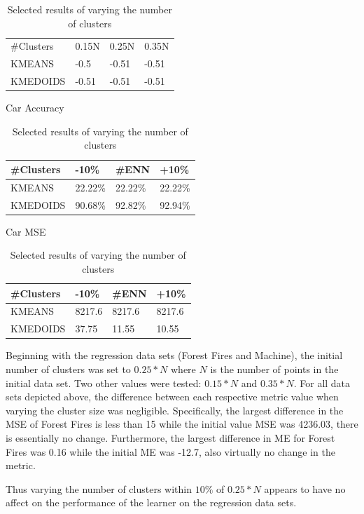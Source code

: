 \documentclass[twoside,11pt]{article}
\begin{document}
\begin{table}[h]
\begin{minipage}[b]{0.45\linewidth}
		\begin{tabular}{llll}
			\cline{1-4}
			\#Clusters & 0.15N & 0.25N & 0.35N \\  \cline{1-4}
			KMEANS     & -0.5  & -0.51 & -0.51 \\
			KMEDOIDS   & -0.51 & -0.51 & -0.51
		\end{tabular}
	\end{minipage}
	\begin{minipage}[b]{0.45\linewidth}\centering
		Car Accuracy
		\begin{tabular}{llll}
			\hline
			\#Clusters & -10\% & \#ENN   & +10\% \\ \hline
			KMEANS     & 22.22\%      & 22.22\% & 22.22\%      \\
			KMEDOIDS   & 90.68\%      & 92.82\% & 92.94\%
		\end{tabular}
	\end{minipage}
	\hspace{0.5cm}
	\begin{minipage}[b]{0.45\linewidth}
		Car MSE
		\centering
		\begin{tabular}{llll}
			\hline
			\#Clusters & -10\% & \#ENN  & +10\% \\ \hline
			KMEANS     & 8217.6       & 8217.6 & 8217.6       \\
			KMEDOIDS   & 37.75        & 11.55  & 10.55
		\end{tabular}
	\end{minipage}
	\caption{Selected results of varying the number of clusters}
\end{table}

Beginning with the regression data sets (Forest Fires and Machine), the initial number of clusters was set to $ 0.25 * N$ where $N$ is the number of points in the initial data set. Two other values were tested: $ 0.15 * N$ and $ 0.35 * N$.
For all data sets depicted above, the difference between each respective metric value when varying the cluster size was negligible.
Specifically, the largest difference in the MSE of Forest Fires is less than 15 while the initial value MSE was 4236.03, there is essentially no change.
Furthermore, the largest difference in ME for Forest Fires was 0.16 while the initial ME was -12.7, also virtually no change in the metric.

Thus varying the number of clusters within $10\%$ of $0.25 * N$ appears to have no affect on the performance of the learner on the regression data sets.
\end{document}
